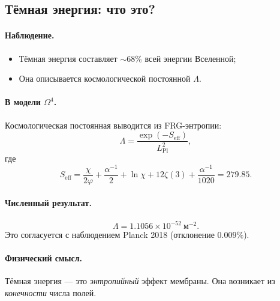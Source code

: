 \documentclass[11pt,a4paper]{article}
\newcommand{\Om}{\Omega^4}
\theoremstyle{definition}
\begin{document}
\subsection{Тёмная энергия: что это?}
\label{subsec:dark-energy}

\paragraph{Наблюдение.}
\begin{itemize}
    \item Тёмная энергия составляет $\sim 68\%$ всей энергии 
          Вселенной;
    \item Она описывается космологической постоянной $\Lambda$.
\end{itemize}

\paragraph{В модели $\Om$.}
Космологическая постоянная выводится из FRG-энтропии:
\begin{equation}
    \boxed{
    \Lambda = \frac{\exp(-S_{\text{eff}})}{L_{\text{Pl}}^2},
    }
    \label{eq:lambda-dm}
\end{equation}
где
\begin{equation}
    S_{\text{eff}} = \frac{\chi}{2\varphi} + \frac{\alpha^{-1}}{2} 
    + \ln \chi + 12 \zeta(3) + \frac{\alpha^{-1}}{1020}
    = 279.85.
\end{equation}

\paragraph{Численный результат.}
\begin{equation}
    \Lambda = 1.1056 \times 10^{-52}~\text{м}^{-2}.
\end{equation}
Это согласуется с наблюдением Planck 2018 
(отклонение $0.009\%$).

\paragraph{Физический смысл.}
Тёмная энергия — это \emph{энтропийный} эффект мембраны. 
Она возникает из \emph{конечности} числа полей.

\end{document}
